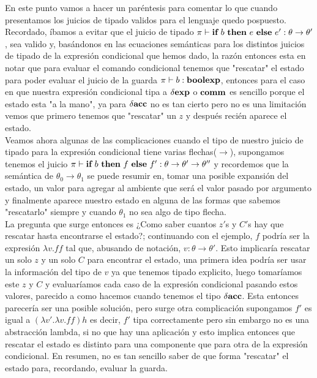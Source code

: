En este punto vamos a hacer un par\'entesis para comentar lo que cuando
presentamos los juicios de tipado validos para el lenguaje quedo pospuesto.
Recordado, \'ibamos a evitar que el juicio de tipado
$\pi \vdash \textbf{if} \ b \ \textbf{then} \ e \ \textbf{else} \ e' : \theta \rightarrow \theta'$, 
sea valido y, bas\'andonos en las ecuaciones sem\'anticas para los 
distintos juicios de tipado de la expresi\'on condicional que hemos
dado, la raz\'on entonces esta en notar que para evaluar el comando
condicional tenemos que "rescatar" el estado para poder evaluar
el juicio de la guarda $\pi \vdash b : \textbf{boolexp}$, entonces para
el caso en que nuestra expresi\'on condicional tipa a 
$\delta \textbf{exp}$ o $\textbf{comm}$ es sencillo porque el estado esta "a la mano",
ya para $\delta \textbf{acc}$ no es tan cierto pero no es una limitaci\'on vemos
que primero tenemos que "rescatar" un $z$ y despu\'es reci\'en aparece
el estado. \\
Veamos ahora algunas de las complicaciones cuando
el tipo de nuestro juicio de tipado para la expresi\'on condicional 
tiene varias flechas($\rightarrow$), supongamos tenemos el juicio
$\pi \vdash \textbf{if} \ b \ \textbf{then} \ f \ \textbf{else} \ f' : \theta \rightarrow \theta' \rightarrow \theta''$ y
recordemos que la sem\'antica de $\theta_0 \rightarrow \theta_1$ se puede 
resumir en, tomar una posible expansi\'on del estado, un valor para agregar 
al ambiente que
ser\'a el valor pasado por argumento y finalmente aparece nuestro estado 
en alguna de las formas que sabemos "rescatarlo" siempre y cuando $\theta_1$
no sea algo de tipo flecha.\\
La pregunta que surge entonces es 
¿Como saber cuantos $z'$s y $C'$s hay que rescatar hasta encontrarse el estado?; 
continuando con el ejemplo, $f$ podr\'ia ser la expresi\'on $\lambda v. ff$ tal que, 
abusando de notaci\'on, $v : \theta \rightarrow \theta'$. Esto 
implicar\'ia rescatar un solo $z$ y un solo $C$ para encontrar el estado, una 
primera idea podr\'ia ser usar la informaci\'on del tipo de $v$ ya que tenemos
tipado explicito, luego 
tomar\'iamos este $z$ y $C$ y evaluar\'iamos cada caso de la expresi\'on
condicional pasando estos valores, parecido a como hacemos cuando
tenemos el tipo $\delta \textbf{acc}$. Esta entonces parecer\'ia ser una posible 
soluci\'on, pero surge otra complicaci\'on supongamos $f'$ es igual a
$(\lambda v' . \lambda v . ff)h$ es decir, $f'$ tipa correctamente pero
sin embargo no es una abstracci\'on lambda, si no que hay una aplicaci\'on
y esto implica entonces que rescatar el estado es distinto para una componente
que para otra de la expresi\'on condicional. En resumen, no es tan sencillo
saber de que forma "rescatar" el estado para, recordando, evaluar la guarda.\\


